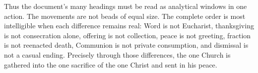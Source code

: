 Thus the document's many headings must be read as analytical windows in one action. The movements are not beads of equal size. The complete order is most intelligible when each difference remains real: Word is not Eucharist, thanksgiving is not consecration alone, offering is not collection, peace is not greeting, fraction is not reenacted death, Communion is not private consumption, and dismissal is not a casual ending. Precisely through those differences, the one Church is gathered into the one sacrifice of the one Christ and sent in his peace.
